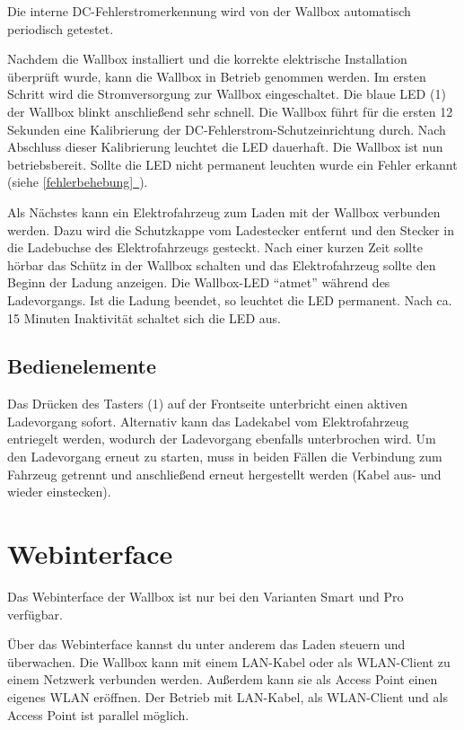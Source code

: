 \documentclass[a4paper,10pt]{article}
\newcommand*{\fullref}[1]{\hyperref[{#1}]{\ref*{#1}~\nameref*{#1}}}
\begin{document}
\begin{multicols*}{2}
	Die interne DC-Fehlerstromerkennung wird von der Wallbox automatisch
	periodisch getestet.

	Nachdem die Wallbox installiert
	und die korrekte elektrische Installation überprüft wurde, kann die Wallbox in
	Betrieb genommen werden.
	Im ersten Schritt wird die Stromversorgung zur Wallbox eingeschaltet. Die
	blaue LED (1) der Wallbox blinkt anschließend sehr schnell. Die Wallbox führt
	für die ersten 12 Sekunden eine Kalibrierung der
	DC-Fehlerstrom-Schutzeinrichtung durch. Nach Abschluss dieser Kalibrierung
	leuchtet die LED dauerhaft. Die Wallbox ist nun betriebsbereit. Sollte die LED
	nicht permanent leuchten wurde ein Fehler erkannt (siehe \fullref{fehlerbehebung}).

	Als Nächstes kann ein Elektrofahrzeug zum Laden mit der Wallbox verbunden
	werden. Dazu wird die Schutzkappe vom Ladestecker entfernt und den Stecker in die
	Ladebuchse des Elektrofahrzeugs gesteckt. Nach einer kurzen Zeit sollte hörbar
	das Schütz in der Wallbox schalten und das Elektrofahrzeug sollte den Beginn
	der Ladung anzeigen. Die Wallbox-LED \enquote{atmet} während des
	Ladevorgangs. Ist die Ladung beendet, so leuchtet die LED permanent. Nach ca.
	15 Minuten Inaktivität schaltet sich die LED aus.

	\subsection{Bedienelemente}\label{lockswitch}
	Das Drücken des Tasters (1) auf der Frontseite unterbricht einen aktiven Ladevorgang
	sofort. Alternativ kann das Ladekabel vom Elektrofahrzeug entriegelt werden,
	wodurch der Ladevorgang ebenfalls unterbrochen wird. Um den Ladevorgang erneut
	zu starten, muss in beiden Fällen die Verbindung zum Fahrzeug getrennt und
	anschließend erneut hergestellt werden (Kabel aus- und wieder einstecken).

	\newpage
	\section{Webinterface}
	Das Webinterface der Wallbox ist nur bei den Varianten Smart und Pro verfügbar.

	Über das Webinterface kannst du unter anderem das Laden steuern und überwachen.
	Die Wallbox kann mit einem LAN-Kabel oder als WLAN-Client zu einem Netzwerk verbunden werden.
	Außerdem kann sie als Access Point einen eigenes WLAN eröffnen.
	Der Betrieb mit LAN-Kabel, als WLAN-Client und als Access Point ist parallel möglich.


\end{multicols*}
\end{document}
